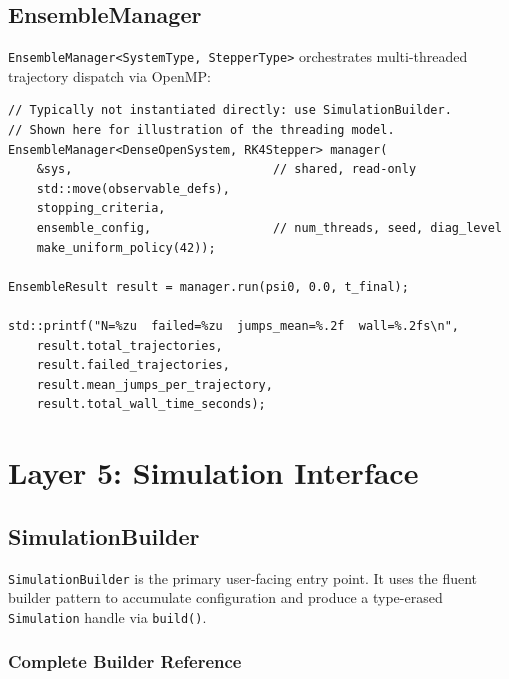 \documentclass[11pt,a4paper,twoside]{book}
\newcommand{\code}[1]{\texttt{\small#1}}
\theoremstyle{definition}
\theoremstyle{remark}
\begin{document}
\section{EnsembleManager}
\label{sec:ensemble-manager}

\code{EnsembleManager<SystemType, StepperType>} orchestrates
multi-threaded trajectory dispatch via OpenMP:

\begin{verbatim}
// Typically not instantiated directly: use SimulationBuilder.
// Shown here for illustration of the threading model.
EnsembleManager<DenseOpenSystem, RK4Stepper> manager(
    &sys,                            // shared, read-only
    std::move(observable_defs),
    stopping_criteria,
    ensemble_config,                 // num_threads, seed, diag_level
    make_uniform_policy(42));

EnsembleResult result = manager.run(psi0, 0.0, t_final);

std::printf("N=%zu  failed=%zu  jumps_mean=%.2f  wall=%.2fs\n",
    result.total_trajectories,
    result.failed_trajectories,
    result.mean_jumps_per_trajectory,
    result.total_wall_time_seconds);
\end{verbatim}

\chapter{Layer 5: Simulation Interface}
\label{chap:simulation}

\section{SimulationBuilder}
\label{sec:simulation-builder}

\code{SimulationBuilder} is the primary user-facing entry point.
It uses the fluent builder pattern to accumulate configuration
and produce a type-erased \code{Simulation} handle via \code{build()}.

\subsection{Complete Builder Reference}
\label{subsec:builder-reference}
\end{document}
